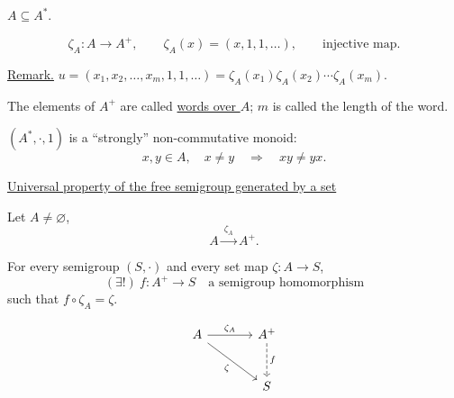 \medskip
\noindent $A\subseteq A^{*}$.

\noindent
\[
\zeta_A:A\longrightarrow A^{+},\qquad
\zeta_A(x)=(x,1,1,\ldots),\qquad\text{injective map}.
\]

\medskip
\noindent\underline{Remark.}\quad
$u=(x_1,x_2,\ldots,x_m,1,1,\ldots)
=\zeta_A(x_1)\zeta_A(x_2)\cdots\zeta_A(x_m)$.

\medskip
\noindent The elements of $A^{+}$ are called \underline{words over $A$};
$m$ is called the length of the word.

\bigskip
\noindent $(A^{*},\cdot,1)$ is a ``strongly'' non-commutative monoid:
\[
x,y\in A,\quad x\neq y\quad\Longrightarrow\quad xy\neq yx.
\]

\bigskip
\noindent{}\quad
\underline{Universal property of the free semigroup generated by a set}

\medskip
\noindent Let $A\neq\varnothing$,
\[A\xrightarrow{\ \zeta_A\ } A^{+}.\]

\noindent For every semigroup $(S,\cdot)$ and every set map
$\zeta:A\longrightarrow S$,
\[
(\exists!)\ f:A^{+}\longrightarrow S\quad\text{a semigroup homomorphism}
\]
\noindent such that $f\circ\zeta_A=\zeta$.

\[
\begin{tikzcd}[column sep=large,row sep=large]
A \arrow[r,"\zeta_A"] \arrow[dr,"\zeta"'] & A^{+} \arrow[d,dashed,"f"] \\
& S
\end{tikzcd}
\]
